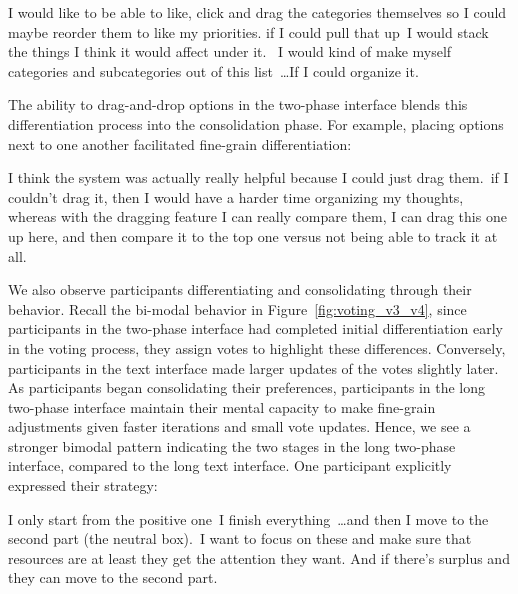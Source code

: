 \begin{displayquote}
    I would like to be able to like, click and drag the categories themselves so I could maybe reorder them to like my priorities. \bracketellipsis if I could pull that up~\bracketellipsis I would stack the things I think it would affect under it. ~\bracketellipsis I would kind of make myself categories and subcategories out of this list~\ldots If I could organize it. \hfill{}
\end{displayquote}

The ability to drag-and-drop options in the two-phase interface blends this differentiation process into the consolidation phase. For example, placing options next to one another facilitated fine-grain differentiation:

\begin{displayquote}
    I think the system was actually really helpful because I could just drag them.~\bracketellipsis if I couldn't drag it, then I would have a harder time organizing my thoughts, whereas with the dragging feature I can really compare them, I can drag this one up here, and then compare it to the top one versus not being able to track it at all. \hfill{}
\end{displayquote}

We also observe participants differentiating and consolidating through their behavior. Recall the bi-modal behavior in Figure~\ref{fig:voting_v3_v4}, since participants in the two-phase interface had completed initial differentiation early in the voting process, they assign votes to highlight these differences. Conversely, participants in the text interface made larger updates of the votes slightly later. As participants began consolidating their preferences, participants in the long two-phase interface maintain their mental capacity to make fine-grain adjustments given faster iterations and small vote updates. Hence, we see a stronger bimodal pattern indicating the two stages in the long two-phase interface, compared to the long text interface. One participant explicitly expressed their strategy:

\begin{displayquote}
    I only start from the positive one~\bracketellipsis I finish everything~\ldots and then I move to the second part (the neutral box).~\bracketellipsis I want to focus on these and make sure that resources are at least they get the attention they want. And if there's surplus and they can move to the second part. \hfill{}
\end{displayquote}

